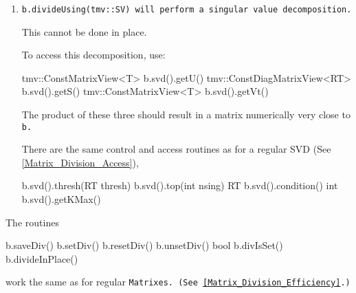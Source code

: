 \begin{enumerate}
The same kind of convolutions need to be done to perform this in place as 
for the LU decomposition.

To access this decomposition, use:\footnote{
I have not yet made a version of the \tt{PackedQ} class for \tt{BandMatrix}.
So unfortunately, here \tt{getQ()} creates the matrix directly and is thus
rather inefficient.}
\begin{tmvcode}
bool b.qrd().isTrans()
tmv::Matrix<T> b.qrd().getQ()
tmv::ConstBandMatrixView<T> b.qrd().getR()
\end{tmvcode}
The following should result in a matrix numerically very close to \tt{b}.
\begin{tmvcode}
tmv::Matrix<T> m2(b.nrows,b.ncols);
tmv::MatrixView<T> m2v = 
      b.qrd().isTrans() ? b2.transpose() : b2.view();
m2v = b.qrd().getQ() * b.qrd().getR();
\end{tmvcode}

\item
\tt{b.divideUsing(tmv::SV)} will perform a singular value decomposition.

This cannot be done in place.

To access this decomposition, use:
\begin{tmvcode}
tmv::ConstMatrixView<T> b.svd().getU()
tmv::ConstDiagMatrixView<RT> b.svd().getS()
tmv::ConstMatrixView<T> b.svd().getVt()
\end{tmvcode}
The product of these three
should result in a matrix numerically very close to \tt{b}.

There are the same control and access routines as for a regular SVD
(See \ref{Matrix_Division_Access}),
\begin{tmvcode}
b.svd().thresh(RT thresh)
b.svd().top(int nsing)
RT b.svd().condition()
int b.svd().getKMax()
\end{tmvcode}

\end{enumerate}
The routines 
\begin{tmvcode}
b.saveDiv()
b.setDiv()
b.resetDiv()
b.unsetDiv()
bool b.divIsSet()
b.divideInPlace()
\end{tmvcode}
work the same as for regular \tt{Matrix}es.
(See \ref{Matrix_Division_Efficiency}.)

